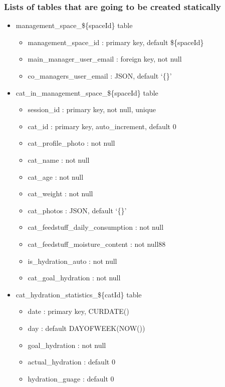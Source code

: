 \documentclass[conference]{IEEEtran}
\begin{document}
\subsubsection{Lists of tables that are going to be created statically}
\begin{itemize}
    \item management\_space\_\$\{spaceId\} table
    \begin{itemize}
        \item management\_space\_id : primary key, default \$\{spaceId\}
        \item main\_manager\_user\_email : foreign key, not null
        \item co\_managers\_user\_email : JSON, default ‘\{\}’
    \end{itemize}
    \item cat\_in\_management\_space\_\$\{spaceId\} table
    \begin{itemize}
        \item session\_id : primary key, not null, unique
        \item cat\_id : primary key, auto\_increment, default 0
        \item cat\_profile\_photo : not null
        \item cat\_name : not null
        \item cat\_age : not null
        \item cat\_weight : not null
        \item cat\_photos : JSON, default ‘\{\}’
        \item cat\_feedstuff\_daily\_consumption : not null
        \item cat\_feedstuff\_moisture\_content : not null88
        \item is\_hydration\_auto : not null
        \item cat\_goal\_hydration : not null
    \end{itemize}
    \item cat\_hydration\_statistics\_\$\{catId\} table
    \begin{itemize}
        \item date : primary key, CURDATE()
        \item day : default DAYOFWEEK(NOW())
        \item goal\_hydration : not null
        \item actual\_hydration : default 0
        \item hydration\_guage : default 0
    \end{itemize}
\end{itemize}
\end{document}
